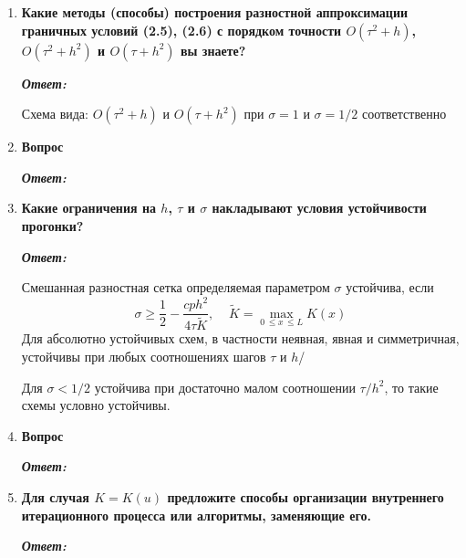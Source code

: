 \documentclass[12pt, a4paper]{article}
\begin{document}
\begin{enumerate}
		\item \textbf{ Какие методы (способы) построения разностной аппроксимации граничных условий (2.5), (2.6) с порядком точности  $O(\tau^2 + h)$, $O(\tau^2 + h^2)$ и $O(\tau + h^2)$ вы знаете?}
		\vspace*{0.2cm}
		
		\textit{\textbf{Ответ:}}
		
		Схема вида: 
		$O(\tau^2 + h)$ и $O(\tau + h^2)$ при $\sigma = 1$ и $\sigma = 1/2$ соответственно
		
		
		\item \textbf{Вопрос}
		\vspace*{0.2cm}
		
		\textit{\textbf{Ответ:}}
		
		\item \textbf{Какие ограничения на $h$, $\tau$ и $\sigma$ накладывают условия устойчивости прогонки?}
		\vspace*{0.2cm}
		
		\textit{\textbf{Ответ:}}
		
		\begin{enumerate}
			Смешанная разностная сетка определяемая параметром $\sigma$ устойчива, если
			\[
			\sigma \ge \dfrac{1}{2} - \dfrac{c p h^2}{4 \tau \tilde{K}}, \;\;\;\; \tilde{K}=\max\limits_{0 \, \le x \, \le L}{K(x)}
			\]
			Для абсолютно устойчивых схем, в частности неявная, явная и симметричная, устойчивы при любых соотношениях шагов $\tau$ и $h$/
			
			Для $\sigma < 1/2$ устойчива при достаточно малом соотношении $\tau/h^2$, то такие схемы условно устойчивы.
		\end{enumerate}
		
		\item \textbf{Вопрос}
		\vspace*{0.2cm}
		
		\textit{\textbf{Ответ:}}
		
		\item \textbf{Для случая $K = K(u)$ предложите способы организации внутреннего итерационного процесса или алгоритмы, заменяющие его.}
		\vspace*{0.2cm}
		
		\textit{\textbf{Ответ:}}
		
	\end{enumerate}

	
	
	
\end{document}
